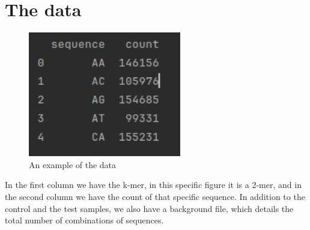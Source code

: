 \chapter{The data}
\begin{figure}[H]
	\centering
	\includegraphics[width=0.7\linewidth]{../figures/data_example}
	\caption{An example of the data}
	\label{fig:data0}
\end{figure}

In the first column we have the k-mer, in this specific figure it is a 2-mer, and in the second column we have the count of that specific sequence. In addition to the control and the test samples, we also have a background file, which details the total number of combinations of sequences.
